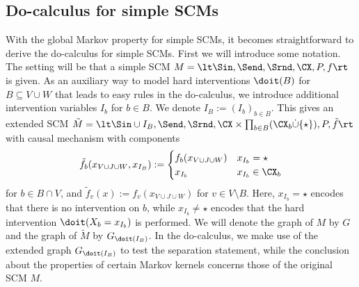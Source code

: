 
\subsection{Do-calculus for simple SCMs}\label{sec:scms_do-calculus}


With the global Markov property for simple SCMs, it becomes straightforward to derive the do-calculus for simple SCMs.
First we will introduce some notation. The setting will be that a simple SCM $M = \lt \Sin, \Send, \Srnd, \CX, P, f \rt$
is given. 
As an auxiliary way to model hard interventions $\doit(B)$ for $B \subseteq V \cup W$ 
that leads to easy rules in the do-calculus, we introduce additional intervention variables
$I_b$ for $b \in B$. We denote $I_B := (I_b)_{b \in B}$.
This gives an extended SCM $\tilde{M} = \lt \Sin \cup I_B, \Send, \Srnd, \CX \times \prod_{b \in B} (\CX_b \dot\cup \{\star\}), P, \tilde{f} \rt$ with causal mechanism with components
$$\tilde{f}_b(x_{V \cup J \cup W},x_{I_B}) := \begin{cases}
  f_b(x_{V \cup J \cup W}) & x_{I_b} = \star \\
  x_{I_b} & x_{I_b} \in \CX_b
\end{cases}$$
for $b \in B \cap V$, and $\tilde{f}_v(x) := f_v(x_{V \cup J \cup W})$ for $v \in V \setminus B$.
Here, $x_{I_b} = \star$ encodes that there is no intervention on $b$, 
while $x_{I_b} \ne \star$ encodes that the hard intervention $\doit(X_b = x_{I_b})$ is performed.
We will denote the graph of $M$ by $G$ and the graph of $\tilde{M}$ by $G_{\doit(I_B)}$.
In the do-calculus, we make use of the extended graph $G_{\doit(I_B)}$ to test the separation statement, while the conclusion
about the properties of certain Markov kernels concerns those of the original SCM $M$.

